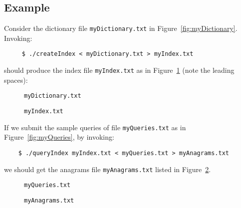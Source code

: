 \documentclass[10pt]{article}
\newcommand{\file}[1]{\texttt{#1}}
\begin{document}
\subsection{Example}
Consider the dictionary file \file{myDictionary.txt} in Figure~\ref{fig:myDictionary}.
Invoking:
\begin{verbatim}
     $ ./createIndex < myDictionary.txt > myIndex.txt
\end{verbatim}
should produce the index file \file{myIndex.txt}
as in Figure~\ref{fig:myIndex}
(note the leading spaces):
\begin{figure}[ht]
    \begin{minipage}[b]{0.45\linewidth}
        \caption{\file{myDictionary.txt}}
        \label{fig:myDictionary}
    \end{minipage}
\hspace{1cm}
    \begin{minipage}[b]{0.45\linewidth}
        \caption{\file{myIndex.txt}}
        \label{fig:myIndex}
    \end{minipage}
\end{figure}

If we submit the sample queries of
file \file{myQueries.txt} as in Figure~\ref{fig:myQueries},
by invoking:
\begin{verbatim}
    $ ./queryIndex myIndex.txt < myQueries.txt > myAnagrams.txt
\end{verbatim}
we should get the anagrams file \file{myAnagrams.txt} listed
in Figure~\ref{fig:myAnagrams}.
\begin{figure}[ht]
    \begin{minipage}[b]{0.45\linewidth}
        \caption{\file{myQueries.txt}}
        \label{fig:myQueries}
    \end{minipage}
\hspace{1cm}
    \begin{minipage}[b]{0.45\linewidth}
        \caption{\file{myAnagrams.txt}}
        \label{fig:myAnagrams}
    \end{minipage}
\end{figure}
\end{document}
